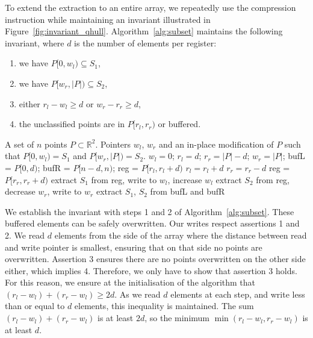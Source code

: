 \documentclass[11pt,a4paper]{article}
\begin{document}
To extend the extraction to an entire array, we repeatedly use the compression instruction while maintaining an invariant illustrated in Figure~\ref{fig:invariant_qhull}.
Algorithm~\ref{alg:subset} maintains the following invariant, where $d$ is the number of elements per register:
\begin{enumerate}
  \item we have $P[0, w_l) \subseteq S_1$,
  \item we have $P[w_r, |P|) \subseteq S_2$,
  \item either $r_l - w_l \geq d$ or $w_r - r_r \geq d$,
  \item the unclassified points are in $P[r_l, r_r)$ or buffered.
\end{enumerate}

\begin{algorithm}[ht]
  \begin{algorithmic}[1]
    \Require A set of $n$ points $P \subset \mathbb{R}^2$.
    \Ensure Pointers $w_l$, $w_r$ and an in-place modification of $P$ such
    that $P[0, w_l) = S_1$ and $P[w_r, |P|) = S_2$.
    \State $w_l = 0$; $r_l = d$; $r_r = |P| - d$; $w_r = |P|$;
    \State bufL = $P[0, d)$; bufR = $P[n - d, n)$;
        \State reg = $P[r_l, r_l + d)$
        \State $r_l = r_l + d$
      \Else
        \State $r_r = r_r - d$
        \State reg = $P[r_r, r_r + d)$
      \EndIf
      \State extract $S_1$ from reg, write to $w_l$, increase $w_l$
      \State extract $S_2$ from reg, decrease $w_r$, write to $w_r$
    \EndWhile
    \State extract $S_1$, $S_2$ from bufL and bufR
  \end{algorithmic}%
  \label{alg:subset}%
\end{algorithm}

We establish the invariant with steps 1 and 2 of Algorithm~\ref{alg:subset}.
These buffered elements can be safely overwritten.
Our writes respect assertions 1 and 2.
We read $d$ elements from the side of the array where the distance between read and write pointer is smallest, ensuring that on that side no points are overwritten.
Assertion 3 ensures there are no points overwritten on the other side either, which implies 4.
Therefore, we only have to show that assertion 3 holds.
For this reason, we ensure at the initialisation of the algorithm that $(r_l - w_l) + (r_r - w_l) \geq 2d$.
As we read $d$ elements at each step, and write less than or equal to $d$ elements, this inequality is maintained.
The sum $(r_l - w_l) + (r_r - w_l)$ is at least $2d$, so the minimum $\min(r_l - w_l, r_r - w_l)$ is at least $d$.
\end{document}
